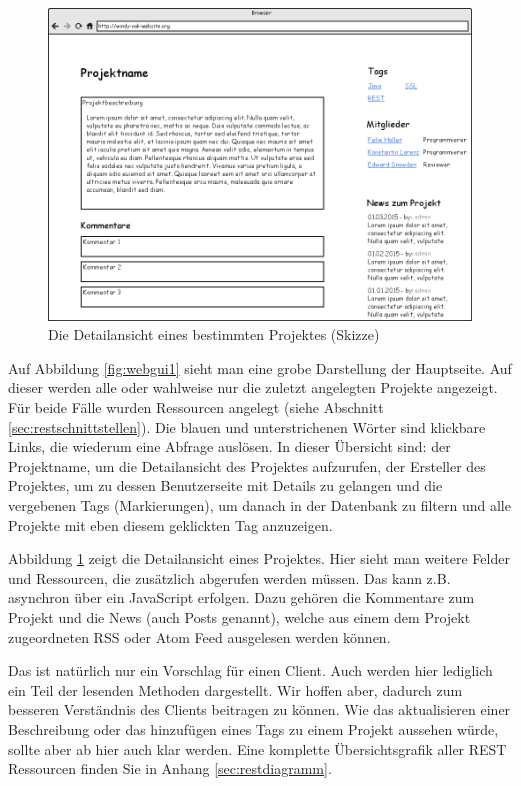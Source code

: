 \documentclass[12pt]{scrartcl}
\begin{document}
		\begin{figure}[h]
			\centering
			\includegraphics[width=0.8\linewidth]{Bilder/Projektseite.png}
			\caption[Projektseite]{Die Detailansicht eines bestimmten Projektes (Skizze)}
			\label{fig:webgui2}
		\end{figure}
		
		Auf Abbildung \ref{fig:webgui1} sieht man eine grobe Darstellung der Hauptseite. Auf dieser werden alle oder wahlweise nur die zuletzt angelegten Projekte angezeigt. Für beide Fälle wurden Ressourcen angelegt (siehe Abschnitt \ref{sec:restschnittstellen}). Die blauen und unterstrichenen Wörter sind klickbare Links, die wiederum eine Abfrage auslösen. In dieser Übersicht sind: der Projektname, um die Detailansicht des Projektes aufzurufen, der Ersteller des Projektes, um zu dessen Benutzerseite mit Details zu gelangen und die vergebenen Tags (Markierungen), um danach in der Datenbank zu filtern und alle Projekte mit eben diesem geklickten Tag anzuzeigen.
		
		Abbildung \ref{fig:webgui2} zeigt die Detailansicht eines Projektes. Hier sieht man weitere Felder und Ressourcen, die zusätzlich abgerufen werden müssen. Das kann z.B. asynchron über ein JavaScript erfolgen. Dazu gehören die Kommentare zum Projekt und die News (auch Posts genannt), welche aus einem dem Projekt zugeordneten RSS oder Atom Feed ausgelesen werden können.
		
		Das ist natürlich nur ein Vorschlag für einen Client. Auch werden hier lediglich ein Teil der lesenden Methoden dargestellt. Wir hoffen aber, dadurch zum besseren Verständnis des Clients beitragen zu können. Wie das aktualisieren einer Beschreibung oder das hinzufügen eines Tags zu einem Projekt aussehen würde, sollte aber ab hier auch klar werden. Eine komplette Übersichtsgrafik aller REST Ressourcen finden Sie in Anhang \ref{sec:restdiagramm}.
		
\end{document}
